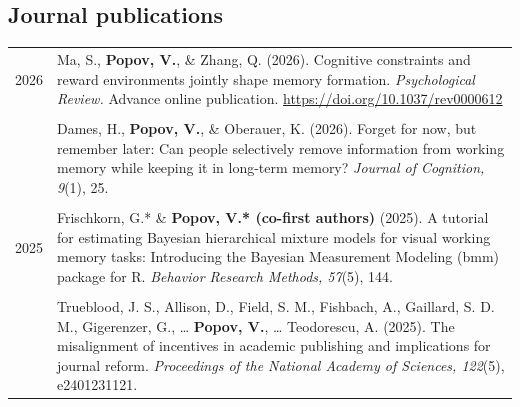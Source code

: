 \documentclass[letterpaper]{article}
\begin{document}
\subsection*{Journal publications}

\begin{longtable}{p{0.7cm}p{15cm}}
  2026 & Ma, S., \textbf{Popov, V.}, \& Zhang, Q. (2026). Cognitive constraints and reward environments jointly shape memory formation. {\it Psychological Review.} Advance online publication. \url{https://doi.org/10.1037/rev0000612}                                                                                                          \\[6pt]
  &                                                                                                                                                                                                                                                                                                                                          \\
  & Dames, H., \textbf{Popov, V.}, \& Oberauer, K. (2026). Forget for now, but remember later: Can people selectively remove information from working memory while keeping it in long-term memory? {\it Journal of Cognition, 9}(1), 25.                                                                                                     \\[6pt]
  &                                                                                                                                                                                                                                                                                                                                          \\
  2025 & Frischkorn, G.* \& \textbf{Popov, V.* (co-first authors)} (2025). A tutorial for estimating Bayesian hierarchical mixture models for visual working memory tasks: Introducing the Bayesian Measurement Modeling (bmm) package for R. {\it Behavior Research Methods, 57}(5), 144.                                                        \\[6pt]
  &                                                                                                                                                                                                                                                                                                                                          \\
  & Trueblood, J. S., Allison, D., Field, S. M., Fishbach, A., Gaillard, S. D. M., Gigerenzer, G., … \textbf{Popov, V.}, … Teodorescu, A. (2025). The misalignment of incentives in academic publishing and implications for journal reform. {\it Proceedings of the National Academy of Sciences, 122}(5), e2401231121.                     \\[6pt]

\end{longtable}
\end{document}
